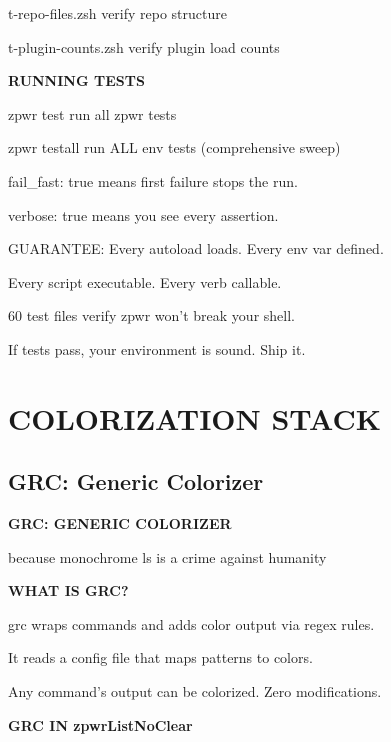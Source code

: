\documentclass[11pt,a4paper,twoside]{book}
\begin{document}
t-repo-files.zsh    verify repo structure

t-plugin-counts.zsh verify plugin load counts


\vspace{12pt}
{\bfseries\color{neonyellow} RUNNING TESTS}\vspace{4pt}

zpwr test     run all zpwr tests

zpwr testall  run ALL env tests (comprehensive sweep)

fail\_fast: true means first failure stops the run.

verbose: true means you see every assertion.

GUARANTEE: Every autoload loads. Every env var defined.

Every script executable. Every verb callable.

60 test files verify zpwr won't break your shell.

If tests pass, your environment is sound. Ship it.


\vspace{16pt}


\chapter{COLORIZATION STACK}

\section{GRC: Generic Colorizer}


\vspace{10pt}
{\large\bfseries\color{neoncyan} GRC: GENERIC COLORIZER}\vspace{6pt}

because monochrome ls is a crime against humanity


\vspace{12pt}
{\bfseries\color{neonyellow} WHAT IS GRC?}\vspace{4pt}

grc wraps commands and adds color output via regex rules.

It reads a config file that maps patterns to colors.

Any command's output can be colorized. Zero modifications.


\vspace{12pt}
{\bfseries\color{neonyellow} GRC IN zpwrListNoClear}\vspace{4pt}
\end{document}
